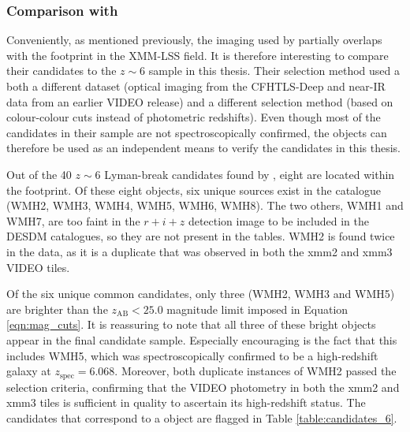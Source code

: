\subsubsection{Comparison with \texorpdfstring{\cite{2013AJ....145....4W}}{TEXT}}\label{subsubsection:willott_compare}
Conveniently, as mentioned previously, the imaging used by \cite{2013AJ....145....4W} partially overlaps with the \DESVIDEO footprint in the XMM-LSS field. It is therefore interesting to compare their candidates to the $z\sim6$ sample in this thesis. Their selection method used a both a different dataset (optical imaging from the CFHTLS-Deep and near-IR data from an earlier VIDEO release) and a different selection method (based on colour-colour cuts instead of photometric redshifts). Even though most of the candidates in their sample are not spectroscopically confirmed, the \cite{2013AJ....145....4W} objects can therefore be used as an independent means to verify the candidates in this thesis.  \par

Out of the 40 $z\sim6$ Lyman-break candidates found by \cite{2013AJ....145....4W}, eight are located within the \DESVIDEO footprint. Of these eight objects, six unique sources exist in the \DESVIDEO catalogue (WMH2, WMH3, WMH4, WMH5, WMH6, WMH8). The two others, WMH1 and WMH7, are too faint in the $r+i+z$ detection image to be included in the DESDM catalogues, so they are not present in the \DESVIDEO tables. WMH2 is found twice in the \DESVIDEO data, as it is a duplicate that was observed in both the xmm2 and xmm3 VIDEO tiles. \par 


Of the six unique common candidates, only three (WMH2, WMH3 and WMH5) are brighter than the $z_{\mathrm{AB}}< 25.0$ magnitude limit imposed in Equation \ref{eqn:mag_cuts}. It is reassuring to note that all three of these bright objects appear in the final \DESVIDEO candidate sample. Especially encouraging is the fact that this includes WMH5, which was spectroscopically confirmed to be a high-redshift galaxy at $z_{\mathrm{spec}}=6.068$. Moreover, both duplicate instances of WMH2 passed the selection criteria, confirming that the VIDEO photometry in both the xmm2 and xmm3 tiles is sufficient in quality to ascertain its high-redshift status. The \DESVIDEO candidates that correspond to a \cite{2013AJ....145....4W} object are flagged in Table \ref{table:candidates_6}. \par

